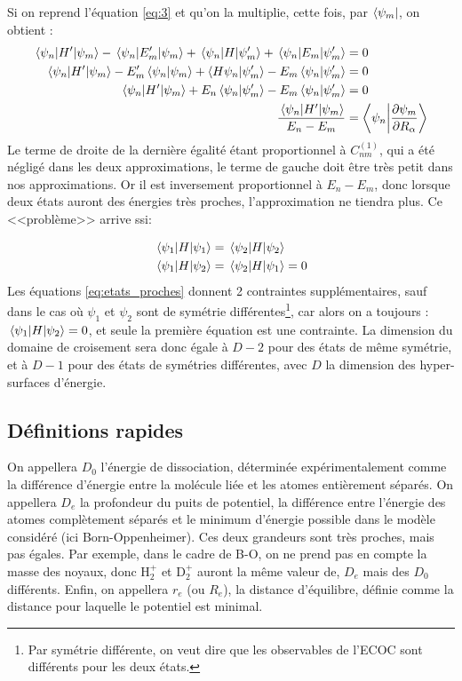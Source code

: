 Si on reprend l'équation \ref{eq:3} et qu'on la multiplie, cette fois, par $\bra{\psi_m}$, on obtient :
\begin{align*}
    \mel{\psi_n}{H'}{\psi_m} - \mel{\psi_n}{E_m'}{\psi_m} + \mel{\psi_n}{H}{\psi_m'} + \mel{\psi_n}{E_m}{\psi_m'} & = 0 \\
    \mel{\psi_n}{H'}{\psi_m} - E_m'\braket{\psi_n}{\psi_m} + \braket{H\psi_n}{\psi_m'} - E_m \braket{\psi_n}{\psi_m'} & = 0 \\
    \mel{\psi_n}{H'}{\psi_m} + E_n\braket{\psi_n}{\psi_m'} - E_m \braket{\psi_n}{\psi_m'} & = 0 \\
    \dfrac{\mel{\psi_n}{H'}{\psi_m}}{E_n-E_m} & = \braket{\psi_n}{\dfrac{\partial\psi_m}{\partial R_{\alpha}}}
\end{align*}
Le terme de droite de la dernière égalité étant proportionnel à $C_{nm}^{(1)}$, qui a été négligé dans les deux approximations, le terme de gauche doit être très petit dans nos approximations. Or il est inversement proportionnel à $E_n-E_m$, donc lorsque deux états auront des énergies très proches, l'approximation ne tiendra plus. Ce <<problème>> arrive ssi:

\begin{equation}\label{eq:etats_proches}
    \begin{split}
        & \mel{\psi_1}{H}{\psi_1} = \mel{\psi_2}{H}{\psi_2} \\
        & \mel{\psi_1}{H}{\psi_2} = \mel{\psi_2}{H}{\psi_1} = 0\\
    \end{split}
\end{equation}
Les équations \ref{eq:etats_proches} donnent 2 contraintes supplémentaires, sauf dans le cas où $\psi_1$ et $\psi_2$ sont de symétrie différentes\footnote{Par symétrie différente, on veut dire que les observables de l'ECOC sont différents pour les deux états.}, car alors on a toujours : $\mel{\psi_1}{H}{\psi_2} = 0$, et seule la première équation est une contrainte. La dimension du domaine de croisement sera donc égale à $D-2$ pour des états de même symétrie, et à $D-1$ pour des états de symétries différentes, avec $D$ la dimension des hyper-surfaces d'énergie.



\subsection{Définitions rapides}
On appellera $D_0$ l'énergie de dissociation, déterminée expérimentalement comme la différence d'énergie entre la molécule liée et les atomes entièrement séparés.
On appellera $D_e$ la profondeur du puits de potentiel, la différence entre l'énergie des atomes complètement séparés et le minimum d'énergie possible dans le modèle considéré (ici Born-Oppenheimer).
Ces deux grandeurs sont très proches, mais pas égales. Par exemple, dans le cadre de B-O, on ne prend pas en compte la masse des noyaux, donc H$^+_2$ et D$^+_2$ auront la même valeur de, $D_e$ mais des $D_0$ différents. Enfin, on appellera $r_e$ (ou $R_e$), la distance d'équilibre, définie comme la distance pour laquelle le potentiel est minimal.


